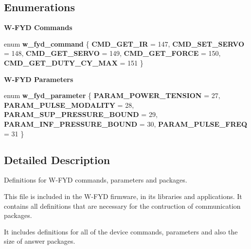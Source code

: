 \subsection*{Enumerations}
\begin{Indent}\textbf{ W-\/\+F\+YD Commands}\par
\begin{DoxyCompactItemize}
\item 
enum \textbf{ w\+\_\+fyd\+\_\+command} \{ \newline
\textbf{ C\+M\+D\+\_\+\+G\+E\+T\+\_\+\+IR} = 147, 
\textbf{ C\+M\+D\+\_\+\+S\+E\+T\+\_\+\+S\+E\+R\+VO} = 148, 
\textbf{ C\+M\+D\+\_\+\+G\+E\+T\+\_\+\+S\+E\+R\+VO} = 149, 
\textbf{ C\+M\+D\+\_\+\+G\+E\+T\+\_\+\+F\+O\+R\+CE} = 150, 
\newline
\textbf{ C\+M\+D\+\_\+\+G\+E\+T\+\_\+\+D\+U\+T\+Y\+\_\+\+C\+Y\+\_\+\+M\+AX} = 151
 \}
\end{DoxyCompactItemize}
\end{Indent}
\begin{Indent}\textbf{ W-\/\+F\+YD Parameters}\par
\begin{DoxyCompactItemize}
\item 
enum \textbf{ w\+\_\+fyd\+\_\+parameter} \{ \newline
\textbf{ P\+A\+R\+A\+M\+\_\+\+P\+O\+W\+E\+R\+\_\+\+T\+E\+N\+S\+I\+ON} = 27, 
\textbf{ P\+A\+R\+A\+M\+\_\+\+P\+U\+L\+S\+E\+\_\+\+M\+O\+D\+A\+L\+I\+TY} = 28, 
\textbf{ P\+A\+R\+A\+M\+\_\+\+S\+U\+P\+\_\+\+P\+R\+E\+S\+S\+U\+R\+E\+\_\+\+B\+O\+U\+ND} = 29, 
\textbf{ P\+A\+R\+A\+M\+\_\+\+I\+N\+F\+\_\+\+P\+R\+E\+S\+S\+U\+R\+E\+\_\+\+B\+O\+U\+ND} = 30, 
\newline
\textbf{ P\+A\+R\+A\+M\+\_\+\+P\+U\+L\+S\+E\+\_\+\+F\+R\+EQ} = 31
 \}
\end{DoxyCompactItemize}
\end{Indent}


\subsection{Detailed Description}
Definitions for W-\/\+F\+YD commands, parameters and packages. 

This file is included in the W-\/\+F\+YD firmware, in its libraries and applications. It contains all definitions that are necessary for the contruction of communication packages.

It includes definitions for all of the device commands, parameters and also the size of answer packages. 

